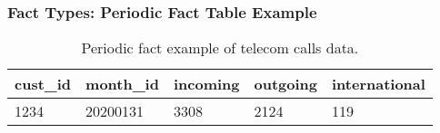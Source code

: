 \begin{frame}
	\frametitle{Fact Types: Periodic Fact Table Example}
     \begin{table}
        		\begin{tabular}{| l | l | l|l|l|}
             	\hline    
                 cust\_id & month\_id  & incoming     & outgoing & international\\
                 		\hline
                 1234       & 20200131        & 3308           & 2124      & 119 \\
    			\hline
    		\end{tabular}            
    	\caption{Periodic fact example of telecom calls data.}
    \end{table}

\end{frame}



